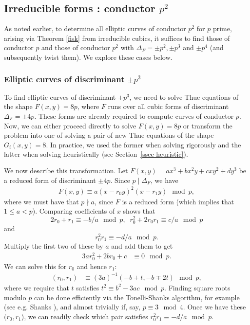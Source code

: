 \subsection{Irreducible forms : conductor $p^2$}

As noted earlier, to determine all  elliptic curves of conductor $p^2$ for $p$ prime, arising via Theorem \ref{fisk} from irreducible cubics, it suffices to find those 
of conductor $p$  and those of conductor $p^2$ with $\Delta_F = \pm p^2, \pm p^3$ and $\pm p^4$ (and subsequently twist 
them). We explore these cases below.

\subsubsection{Elliptic curves of discriminant $\pm p^3$} \label{winky}
To find elliptic curves of discriminant $\pm p^3$, we need to solve Thue equations of the shape $F(x,y) = 8p$, where $F$ runs over all  cubic forms of discriminant $\Delta_F = 
\pm 4p$. These forms are already required to compute curves of conductor $p$. Now, we can either proceed directly to 
solve $F(x,y)=8p$ or transform the problem into one of solving a pair of new Thue equations of the shape $G_i(x,y)=8$. 
In practice, we used the former when solving rigorously and the latter when solving heuristically (see 	
Section~\ref{ssec heuristic}).

We now describe this transformation. Let $F(x,y)=ax^3+bx^2y+cxy^2+dy^3$ be a reduced form of discriminant $\pm 4p$. 
Since $p \mid \Delta_F$, we have
\begin{align*}
F(x,y) \equiv a (x-r_0 y)^2 (x-r_1y) \mod{p},
\end{align*}
where we must have that $p \nmid a$, since $F$ is a reduced form (which implies that $1 \leq a < p$). Comparing 
coefficients of $x$ shows that
$$
2 r_0 + r_1  \equiv -b/a \mod{p}, \; \; 
r_0^2 + 2 r_0 r_1 \equiv c/a \mod{p}
$$
and
$$
r_0^2 r_1 \equiv -d/a \mod{p}.
$$
Multiply the first two of these by $a$ and add them to get
\begin{align*}
3 a r_0^2 + 2 b r_0 + c  & \equiv 0 \mod{p}.
\end{align*}
We can solve this for $r_0$ and hence $r_1$:
\begin{align*}
(r_0,r_1) &\equiv (3a)^{-1} \left(-b \pm t, -b \mp 2t \right)  \mod{p},
\end{align*}
where we require that $t$ satisfies $t^2 \equiv b^2 - 3 ac \mod{p}$. Finding square roots modulo $p$ can be done efficiently via the Tonelli-Shanks 
algorithm, for example (see e.g. Shanks \cite{Shanks}), and almost trivially if, say, $p \equiv 3 \mod{4}$. Once we have these $(r_0,r_1$), we can 
readily check which pair satisfies $r_0^2 r_1 \equiv -d/a \mod{p}$.

